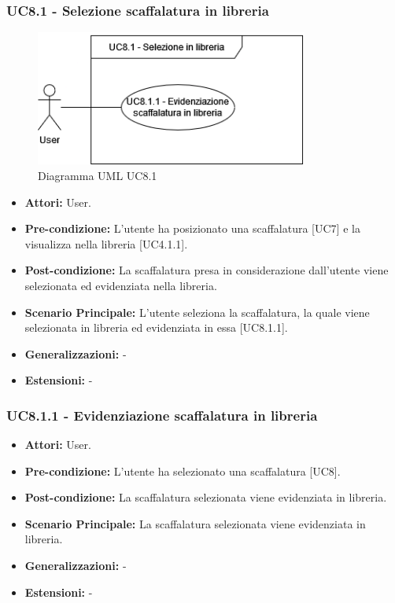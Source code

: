 \subsubsection{UC8.1 - Selezione scaffalatura in libreria}
\begin{figure}[H]
  \centering
  \includegraphics[width=0.8\textwidth]{UC_diagrams_1-10/UC8.1.drawio.png}
   \caption{Diagramma UML UC8.1}
\end{figure}
\begin{itemize}
    \item \textbf{Attori:} User.
    \item \textbf{Pre-condizione:} L'utente ha posizionato una scaffalatura [UC7] e la visualizza nella libreria [UC4.1.1].
    \item \textbf{Post-condizione:} La scaffalatura presa in considerazione dall'utente viene selezionata ed evidenziata nella libreria.
    \item \textbf{Scenario Principale:} L'utente seleziona la scaffalatura, la quale viene selezionata in libreria ed evidenziata in essa [UC8.1.1].
    \item \textbf{Generalizzazioni:} -
    \item \textbf{Estensioni:} -
\end{itemize}


\subsubsection{UC8.1.1 - Evidenziazione scaffalatura in libreria}
\begin{itemize}
    \item \textbf{Attori:} User.
    \item \textbf{Pre-condizione:} L'utente ha selezionato una scaffalatura [UC8].
    \item \textbf{Post-condizione:} La scaffalatura selezionata viene evidenziata in libreria.
    \item \textbf{Scenario Principale:} La scaffalatura selezionata viene evidenziata in libreria.
    \item \textbf{Generalizzazioni:} -
    \item \textbf{Estensioni:} -
\end{itemize}


